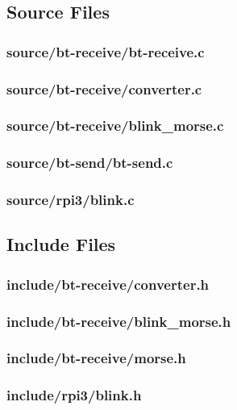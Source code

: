 \subsection{Source Files}


\subsubsection*{source/bt-receive/bt-receive.c}


\subsubsection*{source/bt-receive/converter.c}


\subsubsection*{source/bt-receive/blink\_morse.c}


\subsubsection*{source/bt-send/bt-send.c}


\subsubsection*{source/rpi3/blink.c}



\subsection{Include Files}


\subsubsection*{include/bt-receive/converter.h}


\subsubsection*{include/bt-receive/blink\_morse.h}


\subsubsection*{include/bt-receive/morse.h}


\subsubsection*{include/rpi3/blink.h}


